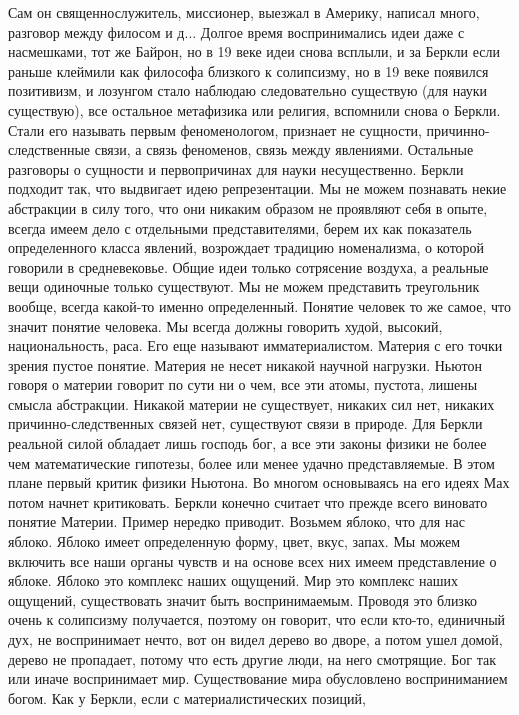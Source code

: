 \documentclass[a4paper, 12pt]{article}
\begin{document}
Сам он священнослужитель, миссионер, выезжал в Америку, написал много, 
разговор между филосом и д... Долгое время воспринимались идеи даже 
с насмешками, тот же Байрон, но в 19 веке идеи снова всплыли, и за 
Беркли если раньше клеймили как философа близкого к солипсизму, но в 19 
веке появился позитивизм, и лозунгом стало наблюдаю следовательно 
существую (для науки существую), все остальное метафизика или религия, 
вспомнили снова о Беркли. Стали его называть первым феноменологом, 
признает не сущности, причинно-следственные связи, а связь феноменов, 
связь между явлениями. Остальные разговоры о сущности и первопричинах 
для науки несущественно. Беркли подходит так, что выдвигает идею 
репрезентации. Мы не можем познавать некие абстракции в силу того, что 
они никаким образом не проявляют себя в опыте, всегда имеем дело 
с отдельными представителями, берем их как показатель определенного 
класса явлений, возрождает традицию номенализма, о которой говорили 
в средневековье. Общие идеи только сотрясение воздуха, а реальные вещи 
одиночные только существуют. Мы не можем представить треугольник вообще, 
всегда какой-то именно определенный. Понятие человек то же самое, что 
значит понятие человека. Мы всегда должны говорить худой, высокий, 
национальность, раса. Его еще называют имматериалистом. Материя с его 
точки зрения пустое понятие. Материя не несет никакой научной нагрузки. 
Ньютон говоря о материи говорит по сути ни о чем, все эти атомы, 
пустота, лишены смысла абстракции. Никакой материи не существует, 
никаких сил нет, никаких причинно-следственных связей нет, существуют 
связи в природе. Для Беркли реальной силой обладает лишь господь бог, 
а все эти законы физики не более чем математические гипотезы, более или 
менее удачно представляемые. В этом плане первый критик физики Ньютона. 
Во многом основываясь на его идеях Мах потом начнет критиковать. Беркли 
конечно считает что прежде всего виновато понятие Материи. Пример 
нередко приводит. Возьмем яблоко, что для нас яблоко. Яблоко имеет 
определенную форму, цвет, вкус, запах. Мы можем включить все наши органы 
чувств и на основе всех них имеем представление о яблоке. Яблоко это 
комплекс наших ощущений. Мир это комплекс наших ощущений, существовать 
значит быть воспринимаемым. Проводя это близко очень к солипсизму 
получается, поэтому он говорит, что если кто-то, единичный дух, не 
воспринимает нечто, вот он видел дерево во дворе, а потом ушел домой, 
дерево не пропадает, потому что есть другие люди, на него смотрящие. Бог 
так или иначе воспринимает мир. Существование мира обусловлено 
восприниманием богом. Как у Беркли, если с материалистических позиций, 
\end{document}
